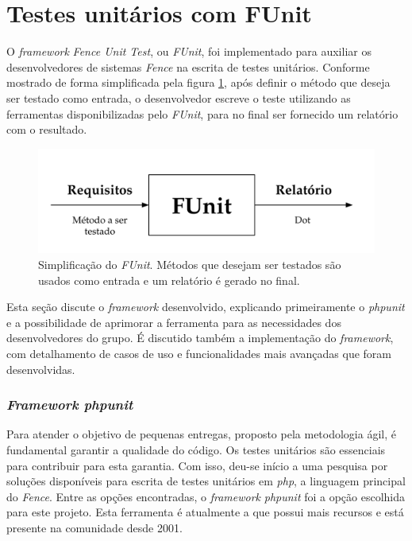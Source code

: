 \hypertarget{fence-unit-test}{%
\section{Testes unitários com FUnit}\label{fence-unit-test}}

O \emph{framework} \emph{Fence Unit Test}, ou \emph{FUnit}, foi implementado para auxiliar os desenvolvedores de sistemas \emph{Fence} na escrita de testes unitários. Conforme mostrado de forma simplificada pela figura \ref{fig:funit-esq}, após definir o método que deseja ser testado como entrada, o desenvolvedor escreve o teste utilizando as ferramentas disponibilizadas pelo \emph{FUnit}, para no final ser fornecido um relatório com o resultado.

\begin{figure}[H]
    \centering
    \includegraphics[width=14cm]{source/4-solucao/images/funit-esq.png}
    \caption{Simplificação do \emph{FUnit}. Métodos que desejam ser testados são usados como entrada e um relatório é gerado no final.}
    \label{fig:funit-esq}
\end{figure}

Esta seção discute o \emph{framework} desenvolvido, explicando primeiramente o \emph{phpunit} e a possibilidade de aprimorar a ferramenta para as necessidades dos desenvolvedores do grupo. É discutido também a implementação do \emph{framework}, com detalhamento de casos de uso e funcionalidades mais avançadas que foram desenvolvidas.

\hypertarget{framework-phpunit}{%
\subsubsection{\texorpdfstring{\emph{Framework phpunit}}{Framework phpunit}}\label{framework-phpunit}}

Para atender o objetivo de pequenas entregas, proposto pela metodologia ágil, é fundamental garantir a qualidade do código. Os testes unitários são essenciais para contribuir para esta garantia. Com isso, deu-se início a uma pesquisa por soluções disponíveis para escrita de testes unitários em \emph{php}, a linguagem principal do \emph{Fence}. Entre as opções encontradas, o \emph{framework} \emph{phpunit} foi a opção escolhida para este projeto. Esta ferramenta é atualmente a que possui mais recursos e está presente na comunidade desde 2001.


